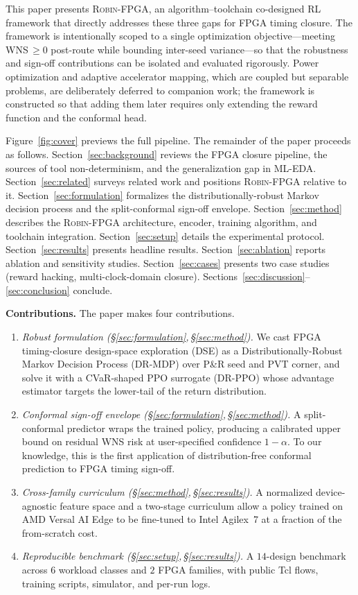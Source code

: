 \documentclass[journal,onecolumn=false]{IEEEtran}
\begin{document}
This paper presents \textsc{Robin-FPGA}, an algorithm--toolchain co-designed RL framework that directly addresses these three gaps for FPGA timing closure. The framework is intentionally scoped to a single optimization objective---meeting WNS\,$\geq 0$ post-route while bounding inter-seed variance---so that the robustness and sign-off contributions can be isolated and evaluated rigorously. Power optimization and adaptive accelerator mapping, which are coupled but separable problems, are deliberately deferred to companion work; the framework is constructed so that adding them later requires only extending the reward function and the conformal head.

Figure~\ref{fig:cover} previews the full pipeline. The remainder of the paper proceeds as follows. Section~\ref{sec:background} reviews the FPGA closure pipeline, the sources of tool non-determinism, and the generalization gap in ML-EDA. Section~\ref{sec:related} surveys related work and positions \textsc{Robin-FPGA} relative to it. Section~\ref{sec:formulation} formalizes the distributionally-robust Markov decision process and the split-conformal sign-off envelope. Section~\ref{sec:method} describes the \textsc{Robin-FPGA} architecture, encoder, training algorithm, and toolchain integration. Section~\ref{sec:setup} details the experimental protocol. Section~\ref{sec:results} presents headline results. Section~\ref{sec:ablation} reports ablation and sensitivity studies. Section~\ref{sec:cases} presents two case studies (reward hacking, multi-clock-domain closure). Sections~\ref{sec:discussion}--\ref{sec:conclusion} conclude.

\smallskip\noindent\textbf{Contributions.} The paper makes four contributions.
\begin{enumerate}
  \item \emph{Robust formulation (\S\ref{sec:formulation},\,\S\ref{sec:method}).} We cast FPGA timing-closure design-space exploration (DSE) as a Distributionally-Robust Markov Decision Process (DR-MDP) over P\&R seed and PVT corner, and solve it with a CVaR-shaped PPO surrogate (\textsc{DR-PPO}) whose advantage estimator targets the lower-tail of the return distribution.
  \item \emph{Conformal sign-off envelope (\S\ref{sec:formulation},\,\S\ref{sec:method}).} A split-conformal predictor wraps the trained policy, producing a calibrated upper bound on residual WNS risk at user-specified confidence $1{-}\alpha$. To our knowledge, this is the first application of distribution-free conformal prediction to FPGA timing sign-off.
  \item \emph{Cross-family curriculum (\S\ref{sec:method},\,\S\ref{sec:results}).} A normalized device-agnostic feature space and a two-stage curriculum allow a policy trained on AMD Versal AI Edge to be fine-tuned to Intel Agilex~7 at a fraction of the from-scratch cost.
  \item \emph{Reproducible benchmark (\S\ref{sec:setup},\,\S\ref{sec:results}).} A $14$-design benchmark across $6$ workload classes and $2$ FPGA families, with public Tcl flows, training scripts, simulator, and per-run logs.
\end{enumerate}
\end{document}
